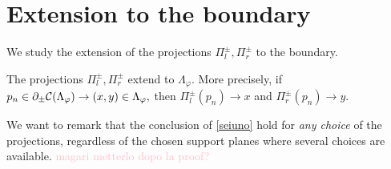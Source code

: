 \section{Extension to the boundary}
We study the extension of the projections $\Pi_l^\pm, \Pi_r^\pm$ to the boundary.
\begin{proposition}\label{seiuno}
    The projections $\Pi_l^\pm, \Pi_r^\pm$ extend to $\Lambda_\varphi$. More precisely, if $p_n\in\partial_\pm\mathcal{C}(\Lambda_\varphi)\to(x,y)\in\Lambda_\varphi,$ then $\Pi_l^\pm(p_n)\to x$ and $\Pi_r^\pm(p_n)\to y$.
\end{proposition}

We want to remark that the conclusion of \ref{seiuno} hold for \textit{any choice} of the projections, regardless of the chosen support planes where several choices are available. \textcolor{pink}{magari metterlo dopo la proof?}

